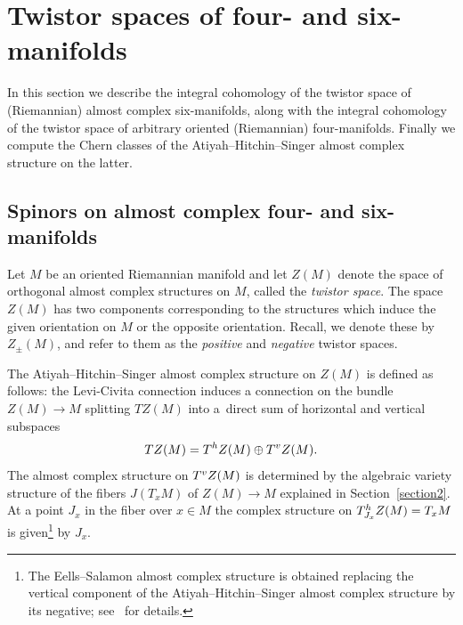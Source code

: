 \documentclass[11pt]{article}
\numberwithin{equation}{section}
\numberwithin{equation}{section}
\begin{document}
\setcounter{footnote}{1}
\section{Twistor spaces of four- and six-manifolds}\label{section3}

In this section we describe the integral cohomology of the twistor space of (Riemannian) almost complex six-manifolds, along with the integral cohomology of the twistor space of arbitrary oriented (Riemannian) four-manifolds. Finally we compute the Chern classes of the Atiyah--Hitchin--Singer almost complex structure on the latter.

\subsection{Spinors on almost complex four- and six-manifolds}

Let $M$ be an oriented Riemannian manifold and let $Z(M)$ denote the space of orthogonal almost complex structures on $M$, called the \emph{twistor space}. The space
$Z(M)$ has two components corresponding to the structures which induce the given orientation on $M$ or the opposite orientation. Recall, we
denote these by $Z_{\pm}(M)$, and refer to them as the \emph{positive} and \emph{negative} twistor spaces.

The Atiyah--Hitchin--Singer almost complex structure on $Z(M)$ is defined as follows: the Levi-Civita connection induces a connection on the bundle $Z(M) \to M$ splitting $TZ(M)$ into a~direct sum of horizontal and vertical subspaces
\[
TZ(M) =T^{\rm h} Z(M) \oplus T^{\rm v}Z(M).
\]
The almost complex structure on $T^{\rm v} Z(M)$ is determined by the algebraic variety structure of the fibers $J(T_x M)$ of $Z(M) \to M$ explained in Section~\ref{section2}. At a point $J_x$ in the fiber
over $x\in M$ the complex structure on $T^{\rm h}_{J_x} Z(M) = T_x M$ is given\footnote{The Eells--Salamon almost complex structure is obtained replacing the vertical component of the Atiyah--Hitchin--Singer almost complex structure by its negative; see~\cite[Section~3]{Sa84} for details.} by $J_x$.
\end{document}

